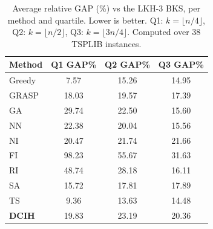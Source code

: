 \documentclass[conference]{IEEEtran}
\begin{document}
\begin{table}[htbp]
\centering
\caption{Average relative GAP (\%) vs the LKH-3 BKS, per method and quartile. Lower is better. Q1: $k=\lfloor n/4\rfloor$, Q2: $k=\lfloor n/2\rfloor$, Q3: $k=\lfloor 3n/4\rfloor$. Computed over 38 TSPLIB instances.}
\label{tab:resumen_gap}
\begin{tabular}{|l|c|c|c|}
\hline
\textbf{Method} & \textbf{Q1 GAP\%} & \textbf{Q2 GAP\%} & \textbf{Q3 GAP\%} \\
\hline
Greedy & 7.57 & 15.26 & 14.95 \\
GRASP & 18.03 & 19.57 & 17.39 \\
GA & 29.74 & 22.50 & 15.60 \\
NN & 22.38 & 20.04 & 15.56 \\
NI & 20.47 & 21.74 & 21.66 \\
FI & 98.23 & 55.67 & 31.63 \\
RI & 48.74 & 28.18 & 16.11 \\
SA & 15.72 & 17.81 & 17.89 \\
TS & 9.36 & 13.63 & 14.48 \\
\textbf{DCIH} & 19.83 & 23.19 & 20.36 \\
\hline
\end{tabular}
\end{table}
\end{document}
